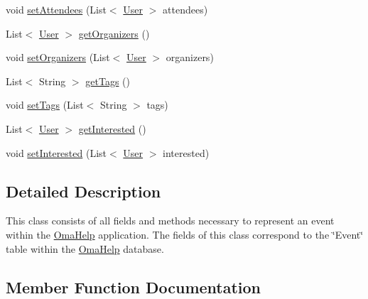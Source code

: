 \begin{DoxyCompactItemize}
\item 
void \mbox{\hyperlink{classedu_1_1uno_1_1omahelp_1_1event_1_1_event_a784217984c5b0b29ae69d64574aab88d}{set\+Attendees}} (List$<$ \mbox{\hyperlink{classedu_1_1uno_1_1omahelp_1_1user_1_1_user}{User}} $>$ attendees)
\item 
List$<$ \mbox{\hyperlink{classedu_1_1uno_1_1omahelp_1_1user_1_1_user}{User}} $>$ \mbox{\hyperlink{classedu_1_1uno_1_1omahelp_1_1event_1_1_event_a9068e3cbcb57d135ff180cab17c0f88e}{get\+Organizers}} ()
\item 
void \mbox{\hyperlink{classedu_1_1uno_1_1omahelp_1_1event_1_1_event_ac1cdaef50c5e0716853bb312e6be7299}{set\+Organizers}} (List$<$ \mbox{\hyperlink{classedu_1_1uno_1_1omahelp_1_1user_1_1_user}{User}} $>$ organizers)
\item 
List$<$ String $>$ \mbox{\hyperlink{classedu_1_1uno_1_1omahelp_1_1event_1_1_event_abc2f6fba0558efc1c46b70f9993b2962}{get\+Tags}} ()
\item 
void \mbox{\hyperlink{classedu_1_1uno_1_1omahelp_1_1event_1_1_event_a3d0ad2bf880727a1b4eb0fdcdffa3439}{set\+Tags}} (List$<$ String $>$ tags)
\item 
List$<$ \mbox{\hyperlink{classedu_1_1uno_1_1omahelp_1_1user_1_1_user}{User}} $>$ \mbox{\hyperlink{classedu_1_1uno_1_1omahelp_1_1event_1_1_event_a9d64fe6ffae57447917cffd0baa96f97}{get\+Interested}} ()
\item 
void \mbox{\hyperlink{classedu_1_1uno_1_1omahelp_1_1event_1_1_event_a117deb1e116c337bbd4236e33c6911d0}{set\+Interested}} (List$<$ \mbox{\hyperlink{classedu_1_1uno_1_1omahelp_1_1user_1_1_user}{User}} $>$ interested)
\end{DoxyCompactItemize}


\subsection{Detailed Description}
This class consists of all fields and methods necessary to represent an event within the \mbox{\hyperlink{classedu_1_1uno_1_1omahelp_1_1_oma_help}{Oma\+Help}} application. The fields of this class correspond to the \char`\"{}\+Event\char`\"{} table within the \mbox{\hyperlink{classedu_1_1uno_1_1omahelp_1_1_oma_help}{Oma\+Help}} database. 

\subsection{Member Function Documentation}
\mbox{\label{classedu_1_1uno_1_1omahelp_1_1event_1_1_event_aaffa1cd5d627632d9e68ab2a481183dc}} 
